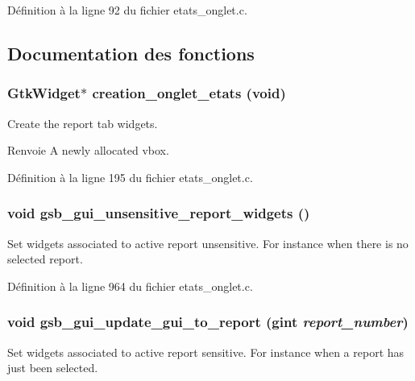 Définition à la ligne 92 du fichier etats\_\-onglet.c.



\subsection{Documentation des fonctions}
\subsubsection[{creation\_\-onglet\_\-etats}]{\setlength{\rightskip}{0pt plus 5cm}GtkWidget$\ast$ creation\_\-onglet\_\-etats (void)}\label{etats__onglet_8c_a285336f1df04e46f0e34f9c5f5264508}
Create the report tab widgets.

\begin{DoxyReturn}{Renvoie}
A newly allocated vbox. 
\end{DoxyReturn}


Définition à la ligne 195 du fichier etats\_\-onglet.c.

\subsubsection[{gsb\_\-gui\_\-unsensitive\_\-report\_\-widgets}]{\setlength{\rightskip}{0pt plus 5cm}void gsb\_\-gui\_\-unsensitive\_\-report\_\-widgets ()}\label{etats__onglet_8c_abb6e5627c18a42073725cc404ec23162}
Set widgets associated to active report unsensitive. For instance when there is no selected report. 

Définition à la ligne 964 du fichier etats\_\-onglet.c.

\subsubsection[{gsb\_\-gui\_\-update\_\-gui\_\-to\_\-report}]{\setlength{\rightskip}{0pt plus 5cm}void gsb\_\-gui\_\-update\_\-gui\_\-to\_\-report (gint {\em report\_\-number})}\label{etats__onglet_8c_a45fec3aed31acd90ea946bd3eab8586e}
Set widgets associated to active report sensitive. For instance when a report has just been selected.


